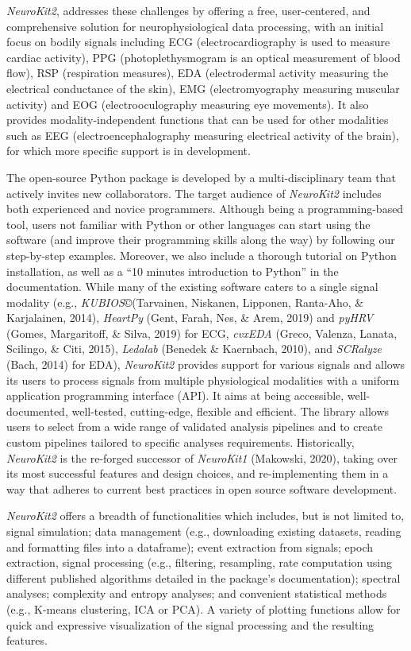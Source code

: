 \documentclass[
  english,
  man,floatsintext]{apa6}
\begin{document}
\emph{NeuroKit2}, addresses these challenges by offering a free, user-centered, and comprehensive solution for neurophysiological data processing, with an initial focus on bodily signals including ECG (electrocardiography is used to measure cardiac activity), PPG (photoplethysmogram is an optical measurement of blood flow), RSP (respiration measures), EDA (electrodermal activity measuring the electrical conductance of the skin), EMG (electromyography measuring muscular activity) and EOG (electrooculography measuring eye movements). It also provides modality-independent functions that can be used for other modalities such as EEG (electroencephalography measuring electrical activity of the brain), for which more specific support is in development.

The open-source Python package is developed by a multi-disciplinary team that actively invites new collaborators. The target audience of \emph{NeuroKit2} includes both experienced and novice programmers. Although being a programming-based tool, users not familiar with Python or other languages can start using the software (and improve their programming skills along the way) by following our step-by-step examples. Moreover, we also include a thorough tutorial on Python installation, as well as a \enquote{10 minutes introduction to Python} in the documentation. While many of the existing software caters to a single signal modality (e.g., \emph{KUBIOS}\copyright (Tarvainen, Niskanen, Lipponen, Ranta-Aho, \& Karjalainen, 2014), \emph{HeartPy} (Gent, Farah, Nes, \& Arem, 2019) and \emph{pyHRV} (Gomes, Margaritoff, \& Silva, 2019) for ECG, \emph{cvxEDA} (Greco, Valenza, Lanata, Scilingo, \& Citi, 2015), \emph{Ledalab} (Benedek \& Kaernbach, 2010), and \emph{SCRalyze} (Bach, 2014) for EDA), \emph{NeuroKit2} provides support for various signals and allows its users to process signals from multiple physiological modalities with a uniform application programming interface (API). It aims at being accessible, well-documented, well-tested, cutting-edge, flexible and efficient. The library allows users to select from a wide range of validated analysis pipelines and to create custom pipelines tailored to specific analyses requirements.
Historically, \emph{NeuroKit2} is the re-forged successor of \emph{NeuroKit1} (Makowski, 2020), taking over its most successful features and design choices, and re-implementing them in a way that adheres to current best practices in open source software development.

\emph{NeuroKit2} offers a breadth of functionalities which includes, but is not limited to, signal simulation; data management (e.g., downloading existing datasets, reading and formatting files into a dataframe); event extraction from signals; epoch extraction, signal processing (e.g., filtering, resampling, rate computation using different published algorithms detailed in the package's documentation); spectral analyses; complexity and entropy analyses; and convenient statistical methods (e.g., K-means clustering, ICA or PCA). A variety of plotting functions allow for quick and expressive visualization of the signal processing and the resulting features.
\end{document}
